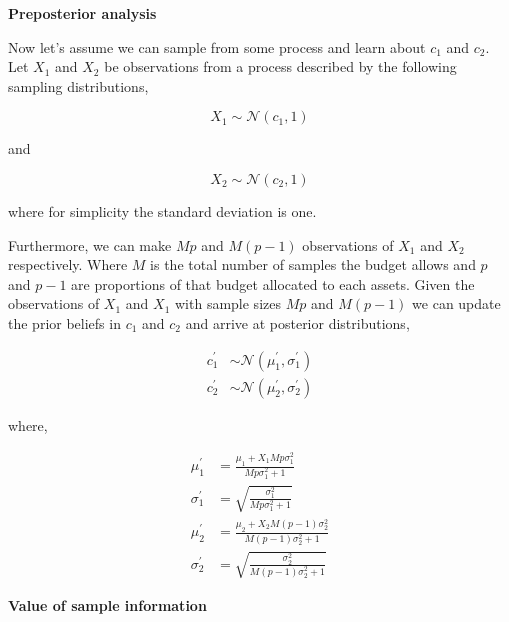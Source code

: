 \documentclass[]{article}
\theoremstyle{definition}
\theoremstyle{definition}
\theoremstyle{remark}
\begin{document}
\textbf{Preposterior analysis}

Now let's assume we can sample from some process and learn about \(c_1\)
and \(c_2\).\\
Let \(X_1\) and \(X_2\) be observations from a process described by the
following sampling distributions,

\begin{equation}
X_1\sim\mathcal{N}\left(c_1, 1\right)
\label{eq:x1}
\end{equation}

and

\begin{equation}
X_2\sim\mathcal{N}\left(c_2, 1\right)
\label{eq:x2}
\end{equation}

where for simplicity the standard deviation is one.

Furthermore, we can make \(Mp\) and \(M(p-1)\) observations of \(X_1\)
and \(X_2\) respectively. Where \(M\) is the total number of samples the
budget allows and \(p\) and \(p-1\) are proportions of that budget
allocated to each assets. Given the observations of \(X_1\) and \(X_1\)
with sample sizes \(Mp\) and \(M(p-1)\) we can update the prior beliefs
in \(c_1\) and \(c_2\) and arrive at posterior distributions,

\begin{equation} 
\begin{aligned}
c_1^\prime &\sim \mathcal{N}(\mu^\prime_1, \sigma^\prime_1)\\
c_2^\prime &\sim \mathcal{N}(\mu^\prime_2, \sigma^\prime_2)
\end{aligned}
\label{eq:posteriorcs}
\end{equation}

where,

\begin{equation}
\begin{aligned}
\mu^\prime_1 &= \frac{\mu_1 + X_1Mp\sigma^2_1}{Mp\sigma^2_1 + 1}\\
\sigma^\prime_1 &= \sqrt{\frac{\sigma^2_1}{Mp\sigma^2_1 + 1}}\\
\mu^\prime_2 &= \frac{\mu_2 + X_2M(p-1)\sigma^2_2}{M(p-1)\sigma^2_2 + 1}\\
\sigma^\prime_2 &= \sqrt{\frac{\sigma^2_2}{M(p-1)\sigma^2_2 + 1}}
\end{aligned}
\label{eq:posteriormusig}
\end{equation}

\textbf{Value of sample information}
\end{document}

